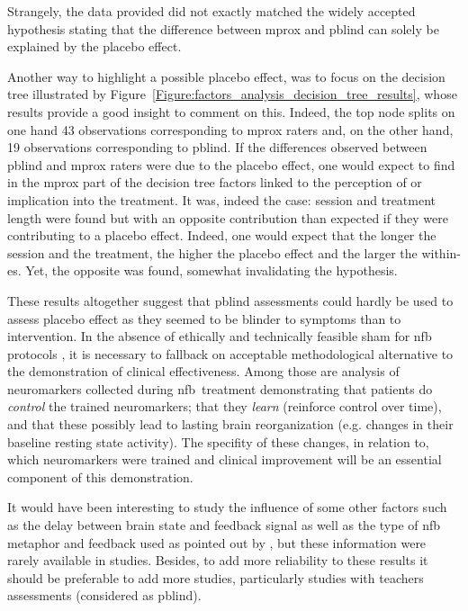 Strangely, the data provided did not exactly matched the widely accepted hypothesis stating that the difference between
\gls{mprox} and \gls{pblind} can solely be explained by the placebo effect. 

Another way to highlight a possible placebo effect, was to focus on the decision tree illustrated by 
Figure~\ref{Figure:factors_analysis_decision_tree_results}, whose results provide a good insight to comment on this.
Indeed, the top node splits on one hand 43 observations corresponding to \gls{mprox} raters and, on the other hand, 
19 observations corresponding to \gls{pblind}. If the differences observed between \gls{pblind} and \gls{mprox} raters were 
due to the placebo effect, one would expect to find in the \gls{mprox} part of the decision tree factors linked to the perception
of or implication into the treatment. It was, indeed the case: session and treatment length were found but with an
opposite contribution than expected if they were contributing to a placebo effect.  Indeed, one would expect that the
longer the session and the treatment, the higher the placebo effect and the larger the within-\gls{es}. Yet, the opposite was found, 
somewhat invalidating the hypothesis. 

These results altogether suggest that \gls{pblind} assessments could hardly be used to assess placebo effect as they seemed to be blinder 
to symptoms than to intervention. In the absence of ethically \citep{Holtmann2014} and technically \citep{Birbaumer1991} feasible sham 
for \gls{nfb} protocols \citep{World-Medical-Association2000}, it is necessary to fallback on acceptable methodological alternative to 
the demonstration of clinical effectiveness. Among those are analysis of neuromarkers collected during \gls{nfb} treatment demonstrating 
that patients do \emph{control} the trained neuromarkers; that they \emph{learn} (reinforce control over time), and that these possibly 
lead to lasting brain reorganization (e.g. changes in their baseline resting state activity). The specifity of these changes, in relation 
to, which neuromarkers were trained and clinical improvement will be an essential component of this demonstration.  

It would have been interesting to study the influence of some other factors such as the delay between brain state and feedback signal 
as well as the type of \gls{nfb} metaphor and feedback used as pointed out by \citet{Alkoby2017}, but these information were rarely 
available in studies. Besides, to add more reliability to these results it should be preferable to add more studies, particularly studies 
with teachers assessments (considered as \gls{pblind}). 

